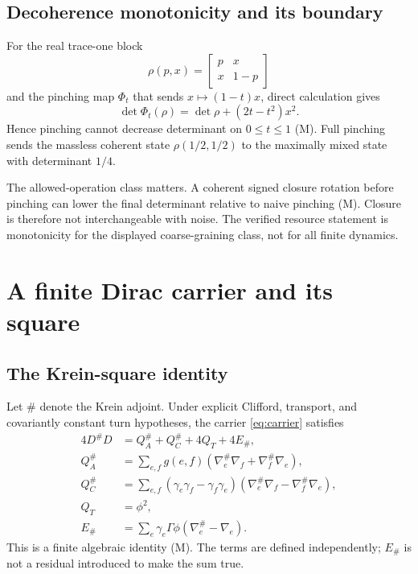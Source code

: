 \documentclass[11pt]{article}
\newcommand{\Mtag}{\textcolor{verified}{\textsc{M}}}
\begin{document}
\subsection{Decoherence monotonicity and its boundary}

For the real trace-one block
\[
  \rho(p,x)=\begin{bmatrix}p&x\\x&1-p\end{bmatrix}
\]
and the pinching map $\Phi_t$ that sends $x\mapsto(1-t)x$, direct calculation
gives
\begin{equation}\label{eq:pinch}
  \det\Phi_t(\rho)=\det\rho+(2t-t^2)x^2.
\end{equation}
Hence pinching cannot decrease determinant on $0\leq t\leq1$ (\Mtag).  Full
pinching sends the massless coherent state
$\rho(1/2,1/2)$ to the maximally mixed state with determinant $1/4$.

The allowed-operation class matters.  A coherent signed closure rotation before
pinching can lower the final determinant relative to naive pinching (\Mtag).
Closure is therefore not interchangeable with noise.  The verified resource
statement is monotonicity for the displayed coarse-graining class, not for all
finite dynamics.

\section{A finite Dirac carrier and its square}

\subsection{The Krein-square identity}

Let $\#$ denote the Krein adjoint.  Under explicit Clifford, transport, and
covariantly constant turn hypotheses, the carrier \eqref{eq:carrier} satisfies
\begin{align}\label{eq:master}
  4D^\#D &= Q_A^\#+Q_C^\#+4Q_T+4E_\#,\\
  Q_A^\#&=\sum_{e,f}g(e,f)
    (\nabla_e^\#\nabla_f+\nabla_f^\#\nabla_e),\nonumber\\
  Q_C^\#&=\sum_{e,f}(\gamma_e\gamma_f-\gamma_f\gamma_e)
    (\nabla_e^\#\nabla_f-\nabla_f^\#\nabla_e),\nonumber\\
  Q_T&=\phi^2,\nonumber\\
  E_\#&=\sum_e\gamma_e\Gamma\phi(\nabla_e^\#-\nabla_e).\nonumber
\end{align}
This is a finite algebraic identity (\Mtag).  The terms are defined
independently; $E_\#$ is not a residual introduced to make the sum true.
\end{document}
